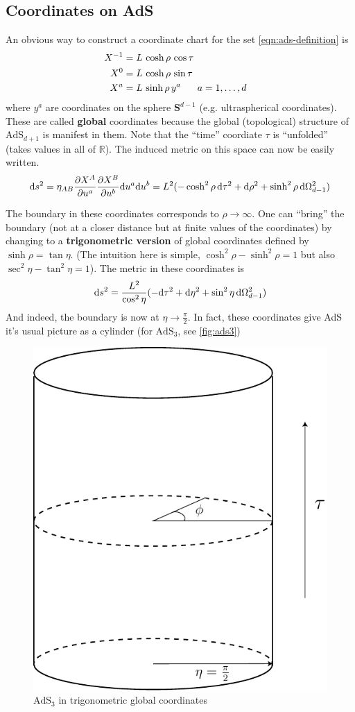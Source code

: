 \documentclass[a4paper,12pt]{article}
\begin{document}
   \subsection{Coordinates on AdS}
      An obvious way to construct a coordinate chart for the set \ref{eqn:ads-definition} is
      \begin{align}
         X^{-1} &= L \, \cosh \rho \, \cos \tau \cr
         X^{0} &= L \, \cosh \rho \, \sin \tau \cr
         X^{a} &= L \, \sinh \rho \, y^{a} \hspace{0.05\linewidth} a = 1, \ldots, d
      \end{align}
      where $y^a$ are coordinates on the sphere $\boldsymbol{S}^{d-1}$ (e.g. ultraspherical coordinates). These are called \textbf{global} coordinates because the global (topological) structure of $\text{AdS}_{d+1}$ is manifest in them. Note that the ``time'' coordiate $\tau$ is ``unfolded'' (takes values in all of $\mathbb{R}$). The induced metric on this space can now be easily written.
      \begin{equation}
         \text{d} s^2 = \eta_{A B} \pdv{X^A}{u^a} \pdv{X^B}{u^b} \text{d} u^a \text{d} u^b = L^2 (-\cosh^2\rho \, \text{d} \tau^2 + \text{d} \rho^2 + \sinh^2\rho \, \text{d} \Omega_{d-1}^2)
      \end{equation}

      The boundary in these coordinates corresponds to $\rho \to \infty$. One can ``bring'' the boundary (not at a closer distance but at finite values of the coordinates) by changing to a \textbf{trigonometric version} of global coordinates defined by $\sinh \rho = \tan \eta$. (The intuition here is simple, $\cosh^2\rho - \sinh^2\rho = 1$ but also $\sec^2\eta - \tan^2\eta = 1$). The metric in these coordinates is
      \begin{equation}
         \text{d} s^2 = \frac{L^2}{\cos^2\eta} (-\text{d} \tau^2 + \text{d} \eta^2 + \sin^2\eta \, \text{d} \Omega_{d-1}^2)
      \end{equation}
      And indeed, the boundary is now at $\eta \to \frac{\pi}{2}$. In fact, these coordinates give AdS it's usual picture as a cylinder (for $\text{AdS}_3$, see \autoref{fig:ads3})
      \begin{figure}[H]
         \centering
         \includegraphics[width=0.5\linewidth]{cylinder.pdf}
         \caption{$\text{AdS}_3$ in trigonometric global coordinates}
         \label{fig:ads3}
      \end{figure}
\end{document}
